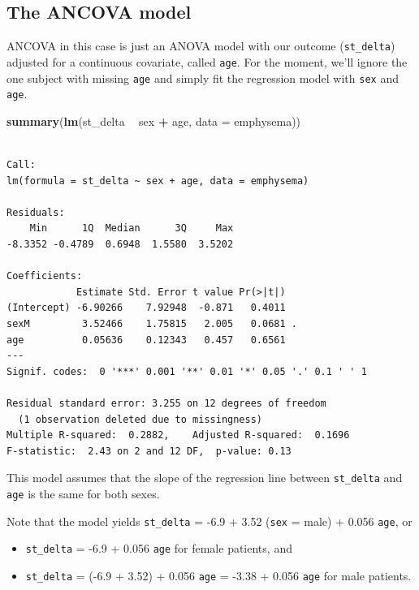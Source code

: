 \documentclass[]{book}
\newenvironment{Shaded}{\begin{snugshade}}{\end{snugshade}}
\newcommand{\KeywordTok}[1]{\textcolor[rgb]{0.13,0.29,0.53}{\textbf{#1}}}
\newcommand{\DataTypeTok}[1]{\textcolor[rgb]{0.13,0.29,0.53}{#1}}
\newcommand{\StringTok}[1]{\textcolor[rgb]{0.31,0.60,0.02}{#1}}
\newcommand{\OperatorTok}[1]{\textcolor[rgb]{0.81,0.36,0.00}{\textbf{#1}}}
\newcommand{\NormalTok}[1]{#1}
\providecommand{\tightlist}{%
  \setlength{\itemsep}{0pt}\setlength{\parskip}{0pt}}
\theoremstyle{definition}
\theoremstyle{definition}
\theoremstyle{definition}
\theoremstyle{remark}
\begin{document}
\subsection{The ANCOVA model}\label{the-ancova-model}

ANCOVA in this case is just an ANOVA model with our outcome
(\texttt{st\_delta}) adjusted for a continuous covariate, called
\texttt{age}. For the moment, we'll ignore the one subject with missing
\texttt{age} and simply fit the regression model with \texttt{sex} and
\texttt{age}.

\begin{Shaded}
\begin{Highlighting}[]
\KeywordTok{summary}\NormalTok{(}\KeywordTok{lm}\NormalTok{(st_delta }\OperatorTok{~}\StringTok{ }\NormalTok{sex }\OperatorTok{+}\StringTok{ }\NormalTok{age, }\DataTypeTok{data =}\NormalTok{ emphysema))}
\end{Highlighting}
\end{Shaded}

\begin{verbatim}

Call:
lm(formula = st_delta ~ sex + age, data = emphysema)

Residuals:
    Min      1Q  Median      3Q     Max 
-8.3352 -0.4789  0.6948  1.5580  3.5202 

Coefficients:
            Estimate Std. Error t value Pr(>|t|)  
(Intercept) -6.90266    7.92948  -0.871   0.4011  
sexM         3.52466    1.75815   2.005   0.0681 .
age          0.05636    0.12343   0.457   0.6561  
---
Signif. codes:  0 '***' 0.001 '**' 0.01 '*' 0.05 '.' 0.1 ' ' 1

Residual standard error: 3.255 on 12 degrees of freedom
  (1 observation deleted due to missingness)
Multiple R-squared:  0.2882,    Adjusted R-squared:  0.1696 
F-statistic:  2.43 on 2 and 12 DF,  p-value: 0.13
\end{verbatim}

This model assumes that the slope of the regression line between
\texttt{st\_delta} and \texttt{age} is the same for both sexes.

Note that the model yields \texttt{st\_delta} = -6.9 + 3.52
(\texttt{sex} = male) + 0.056 \texttt{age}, or

\begin{itemize}
\tightlist
\item
  \texttt{st\_delta} = -6.9 + 0.056 \texttt{age} for female patients,
  and
\item
  \texttt{st\_delta} = (-6.9 + 3.52) + 0.056 \texttt{age} = -3.38 +
  0.056 \texttt{age} for male patients.
\end{itemize}
\end{document}
